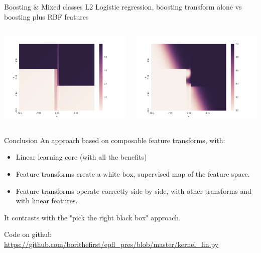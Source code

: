 \documentclass[11pt]{beamer}
\begin{document}
\begin{frame}{Boosting \& Mixed classes}
L2 Logistic regression, boosting transform alone vs boosting plus RBF features
\begin{columns}
\includegraphics[scale=0.3]{boosting_only_hm.png} 

\includegraphics[scale=0.3]{boosting_nys_hm.png} 
\end{columns}

\end{frame}

\begin{frame}{Conclusion}
An approach based on composable feature transforms, with:
\begin{itemize}
\item Linear learning core (with all the benefits)
\item Feature transforms create a white box, supervised map of the feature space.
\item Feature transforms operate correctly side by side, with other transforms and with linear features.
\end{itemize}
It contrasts with the "pick the right black box" approach.

Code on github \url{https://github.com/borithefirst/epfl_pres/blob/master/kernel_lin.py}
\end{frame}
\end{document}
